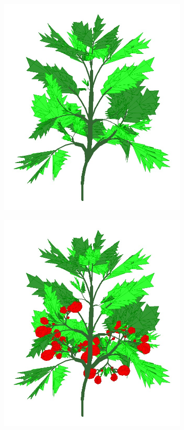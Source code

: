 \begin{figure}[ht]
\begin{subfigure}{.24\textwidth}
		\label{fig:sub2}
	\end{subfigure}%
	\begin{subfigure}{.24\textwidth}
		\centering
		\includegraphics[width=\linewidth]{plantAging003.jpg}
		\label{fig:sub3}
	\end{subfigure}%
	\begin{subfigure}{.24\textwidth}
		\centering
		\includegraphics[width=\linewidth]{plantAging004.jpg}

\end{subfigure}
\end{figure}
